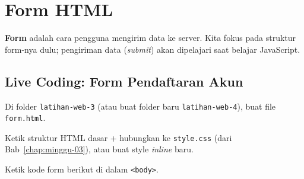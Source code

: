 \section{Form HTML}
\label{sec:m04-form}

\begin{catatan}
\textbf{Form} adalah cara pengguna mengirim data ke server. Kita fokus pada struktur form-nya dulu; pengiriman data (\emph{submit}) akan dipelajari saat belajar JavaScript.
\end{catatan}

\subsection{Live Coding: Form Pendaftaran Akun}

\begin{langkah}
  \item Di folder \texttt{latihan-web-3} (atau buat folder baru \texttt{latihan-web-4}), buat file \texttt{form.html}.
  \item Ketik struktur HTML dasar + hubungkan ke \texttt{style.css} (dari Bab~\ref{chap:minggu-03}), atau buat style \emph{inline} baru.
  \item Ketik kode form berikut di dalam \texttt{<body>}.
\end{langkah}


